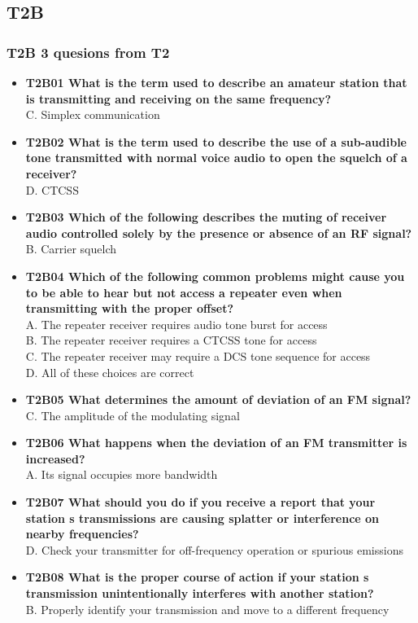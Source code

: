 \documentclass[10pt]{beamer}
\begin{document}
\subsection{T2B}
\begin{frame}
\frametitle{T2B 3 quesions from T2}
\begin{itemize}[<+->]
\tiny
\item\textbf{T2B01 What is the term used to describe an amateur station that is transmitting and receiving on the same frequency?}\\ C. Simplex communication
\item\textbf{T2B02 What is the term used to describe the use of a sub-audible tone transmitted with normal voice audio to open the squelch of a receiver?}\\ D. CTCSS
\item\textbf{T2B03 Which of the following describes the muting of receiver audio controlled solely by the presence or absence of an RF signal?}\\ B. Carrier squelch
\item\textbf{T2B04 Which of the following common problems might cause you to be able to hear but not access a repeater even when transmitting with the proper offset?}\\ A. The repeater receiver requires audio tone burst for access\\B. The repeater receiver requires a CTCSS tone for access\\C. The repeater receiver may require a DCS tone sequence for access\\D. All of these choices are correct
\item\textbf{T2B05 What determines the amount of deviation of an FM signal?}\\ C. The amplitude of the modulating signal
\item\textbf{T2B06 What happens when the deviation of an FM transmitter is increased?}\\ A. Its signal occupies more bandwidth
\item\textbf{T2B07 What should you do if you receive a report that your station s transmissions are causing splatter or interference on nearby frequencies?}\\ D. Check your transmitter for off-frequency operation or spurious emissions
\item\textbf{T2B08 What is the proper course of action if your station s transmission unintentionally interferes with another station?}\\ B. Properly identify your transmission and move to a different frequency

\end{itemize}
\end{frame}
\end{document}
